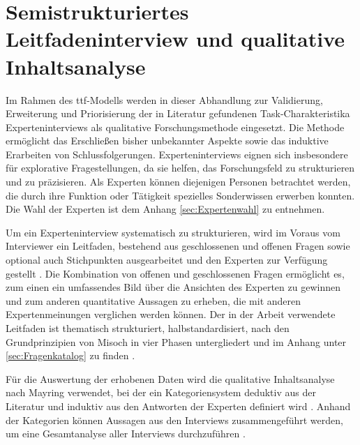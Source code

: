 \section{Semistrukturiertes Leitfadeninterview und qualitative Inhaltsanalyse}

Im Rahmen des \ac{ttf}-Modells werden in dieser Abhandlung zur Validierung, Erweiterung und Priorisierung der in Literatur gefundenen Task-Charakteristika Experteninterviews als qualitative Forschungsmethode eingesetzt. Die Methode ermöglicht das Erschließen bisher unbekannter Aspekte sowie das induktive Erarbeiten von Schlussfolgerungen. Experteninterviews eignen sich insbesondere für explorative Fragestellungen, da sie helfen, das Forschungsfeld zu strukturieren und zu präzisieren. Als Experten können diejenigen Personen betrachtet werden, die durch ihre Funktion oder Tätigkeit spezielles Sonderwissen erwerben konnten. \autocite[Vgl.][S. 119-127]{MISOCH2019} Die Wahl der Experten ist dem Anhang \ref{sec:Expertenwahl} zu entnehmen.

Um ein Experteninterview systematisch zu strukturieren, wird im Voraus vom Interviewer ein Leitfaden, bestehend aus geschlossenen und offenen Fragen sowie optional auch Stichpunkten ausgearbeitet und den Experten zur Verfügung gestellt \autocite[Vgl.][S. 670]{HELFFERICH2019}. Die Kombination von offenen und geschlossenen Fragen ermöglicht es, zum einen ein umfassendes Bild über die Ansichten des Experten zu gewinnen und zum anderen quantitative Aussagen zu erheben, die mit anderen Expertenmeinungen verglichen werden können. Der in der Arbeit verwendete Leitfaden ist thematisch strukturiert, halbstandardisiert, nach den Grundprinzipien von Misoch in vier Phasen untergliedert und im Anhang unter \ref{sec:Fragenkatalog} zu finden \autocite[Vgl.][S. 68f]{MISOCH2019}.  

Für die Auswertung der erhobenen Daten wird die qualitative Inhaltsanalyse nach Mayring verwendet, bei der ein Kategoriensystem deduktiv aus der Literatur und induktiv aus den Antworten der Experten definiert wird \autocite[Vgl.][S. 633-634]{MAYRING2019}. Anhand der Kategorien können Aussagen aus den Interviews zusammengeführt werden, um eine Gesamtanalyse aller Interviews durchzuführen \autocite[Vgl.][S. 74]{BOGNER2014}. 



